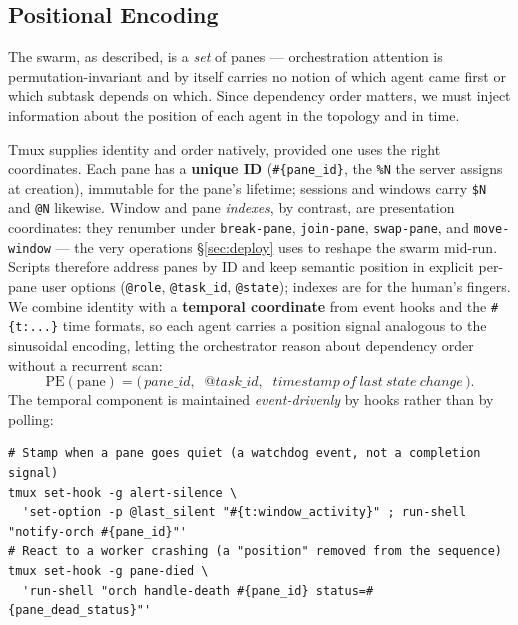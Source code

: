 \documentclass[10pt]{article}
\newcommand{\code}[1]{\texttt{\small #1}}
\begin{document}
\subsection{Positional Encoding}\label{sec:pe}

The swarm, as described, is a \emph{set} of panes --- orchestration attention is
permutation-invariant and by itself carries no notion of which agent came first or
which subtask depends on which. Since dependency order matters, we must inject
information about the position of each agent in the topology and in time.

Tmux supplies identity and order natively, provided one uses the right coordinates.
Each pane has a \textbf{unique ID} (\code{\#\{pane\_id\}}, the \code{\%N} the server
assigns at creation), immutable for the pane's lifetime; sessions and windows carry
\code{\$N} and \code{@N} likewise. Window and pane \emph{indexes}, by contrast, are
presentation coordinates: they renumber under \code{break-pane}, \code{join-pane},
\code{swap-pane}, and \code{move-window} --- the very operations
\S\ref{sec:deploy} uses to reshape the swarm mid-run. Scripts therefore address
panes by ID and keep semantic position in explicit per-pane user options
(\code{@role}, \code{@task\_id}, \code{@state}); indexes are for the human's
fingers. We combine identity with a \textbf{temporal coordinate} from event hooks
and the \code{\#\{t:...\}} time formats, so each agent carries a position signal
analogous to the sinusoidal encoding, letting the orchestrator reason about
dependency order without a recurrent scan:
\[
\mathrm{PE}(\mathrm{pane}) =
  \big(\, \mathit{pane\_id},\;\; \mathit{@task\_id},\;\;
          \mathit{timestamp\ of\ last\ state\ change} \,\big).
\]
The temporal component is maintained \emph{event-drivenly} by hooks rather than by
polling:

\begin{lstlisting}
# Stamp when a pane goes quiet (a watchdog event, not a completion signal)
tmux set-hook -g alert-silence \
  'set-option -p @last_silent "#{t:window_activity}" ; run-shell "notify-orch #{pane_id}"'
# React to a worker crashing (a "position" removed from the sequence)
tmux set-hook -g pane-died \
  'run-shell "orch handle-death #{pane_id} status=#{pane_dead_status}"'
\end{lstlisting}
\end{document}
